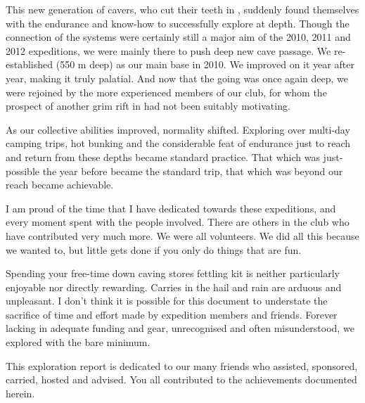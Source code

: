 This new generation of cavers, who cut their teeth in ,
suddenly found themselves with the endurance and know-how to
successfully explore at depth. Though the connection of the systems were
certainly still a major aim of the 2010, 2011 and 2012 expeditions, we were
mainly there to push deep new cave passage. We re-established  (550 m deep) as our main base in 2010. We improved on it year after
year, making it truly palatial. And now that the going was once again
deep, we were rejoined by the more experienced members of our club, for
whom the prospect of another grim rift in  had not been
suitably motivating.

As our collective abilities improved, normality shifted. Exploring over
multi-day camping trips, hot bunking and the considerable feat of
endurance just to reach and return from these depths became standard
practice. That which was just-possible the year before became the
standard trip, that which was beyond our reach became achievable.

I am proud of the time that I have dedicated towards these expeditions,
and every moment spent with the people involved. There are others in the
club who have contributed very much more. We were all volunteers. We did
all this because we wanted to, but little gets done if you only do
things that are fun.

Spending your free-time down caving stores fettling kit is neither
particularly enjoyable nor directly rewarding. Carries in the hail and
rain are arduous and unpleasant. I don't think it is possible for this
document to understate the sacrifice of time and effort made by
expedition members and friends. Forever lacking in adequate funding and
gear, unrecognised and often misunderstood, we explored with the bare
minimum.

This exploration report is dedicated to our many friends who assisted,
sponsored, carried, hosted and advised. You all contributed to the
achievements documented herein.


